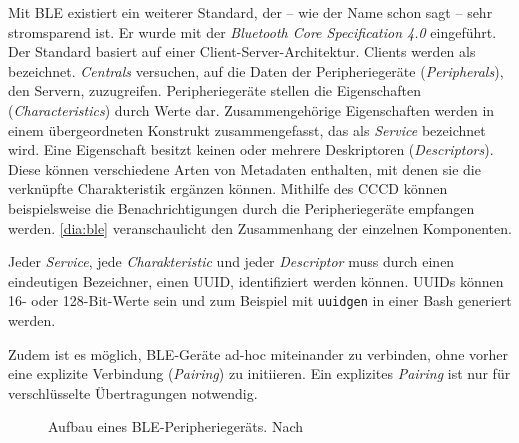 Mit \ac{BLE} existiert ein weiterer Standard, der -- wie der Name schon sagt -- sehr stromsparend ist. Er wurde mit der \emph{Bluetooth Core Specification 4.0} eingeführt. Der Standard basiert auf einer Client-Server-Architektur. Clients werden als  bezeichnet. \emph{Centrals} versuchen, auf die Daten der Peripheriegeräte (\emph{Peripherals}), den Servern, zuzugreifen. Peripheriegeräte stellen die Eigenschaften (\emph{Characteristics}) durch Werte dar. Zusammengehörige Eigenschaften werden in einem übergeordneten Konstrukt zusammengefasst, das als \emph{Service} bezeichnet wird. Eine Eigenschaft besitzt keinen oder mehrere Deskriptoren (\emph{Descriptors}). Diese können verschiedene Arten von Metadaten enthalten, mit denen sie die verknüpfte Charakteristik ergänzen können. Mithilfe des \ac{CCCD} können beispielsweise die Benachrichtigungen durch die Peripheriegeräte empfangen werden. \autoref{dia:ble} veranschaulicht den Zusammenhang der einzelnen Komponenten.

Jeder \emph{Service}, jede \emph{Charakteristic} und jeder \emph{Descriptor} muss durch einen eindeutigen Bezeichner, einen \ac{UUID}, identifiziert werden können. \acp{UUID} können 16- oder 128-Bit-Werte sein und zum Beispiel mit \texttt{uuidgen} in einer Bash generiert werden.

Zudem ist es möglich, \ac{BLE}-Geräte ad-hoc miteinander zu verbinden, ohne vorher eine explizite Verbindung (\emph{Pairing}) zu initiieren. Ein explizites \emph{Pairing} ist nur für verschlüsselte Übertragungen notwendig.

\begin{figure}[ht]
	\begin{adjustbox}{scale=0.7,center} %
	\end{adjustbox}
	\caption{\label{dia:ble}Aufbau eines BLE-Peripheriegeräts. Nach \cite{Kolban:2018:BLE-C-Guide}}
\end{figure}

